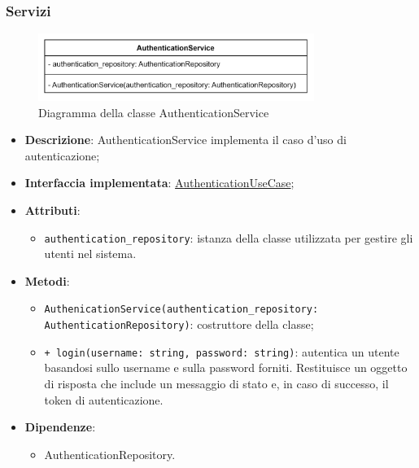\subsubsection{Servizi}

 \label{AuthenticationService}
\begin{figure}[H]
    \centering
    \includegraphics[width=0.8\textwidth]{assets/Backend/authentication_service.png}
    \caption{Diagramma della classe AuthenticationService}
  \end{figure}
\begin{itemize}
    \item \textbf{Descrizione}: AuthenticationService implementa il caso d'uso di autenticazione;
    \item \textbf{Interfaccia implementata}: \hyperref[AuthenticationUseCase]{AuthenticationUseCase};
    \item \textbf{Attributi}:
    \begin{itemize}
        \item \texttt{authentication\_repository}: istanza della classe utilizzata per gestire gli utenti nel sistema.
    \end{itemize}
    \item \textbf{Metodi}: 
    \begin{itemize}
        \item \texttt{AuthenicationService(authentication\_repository: AuthenticationRepository)}: costruttore della classe;
        \item \texttt{+ login(username: string, password: string)}: autentica un utente basandosi sullo username e sulla password forniti. Restituisce un oggetto di risposta che include un messaggio di stato e, in caso di successo, il token di autenticazione.
    \end{itemize}
    \item \textbf{Dipendenze}:
    \begin{itemize}
        \item AuthenticationRepository.
    \end{itemize}
\end{itemize}  

